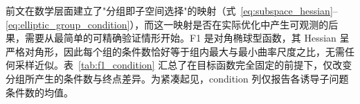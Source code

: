 前文在数学层面建立了"分组即子空间选择"的映射（式~\eqref{eq:subspace_hessian}--\eqref{eq:elliptic_group_condition}），而这一映射是否在实际优化中产生可观测的后果，需要从最简单的可精确验证情形开始。F1 是对角椭球型函数，其 Hessian 呈严格对角形，因此每个组的条件数恰好等于组内最大与最小曲率尺度之比，无需任何采样近似。表~\ref{tab:f1_condition} 汇总了在目标函数完全固定的前提下，仅改变分组所产生的条件数与终点差异。为紧凑起见，condition 列仅报告各诱导子问题条件数的均值。

